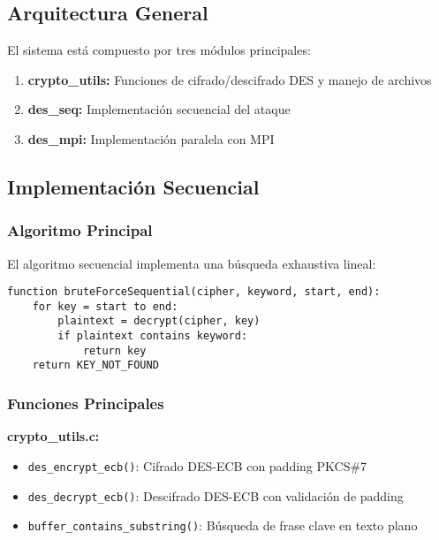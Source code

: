 \documentclass[12pt,letterpaper]{article}
\begin{document}
\subsection{Arquitectura General}

El sistema está compuesto por tres módulos principales:

\begin{enumerate}
    \item \textbf{crypto\_utils:} Funciones de cifrado/descifrado DES y manejo de archivos
    \item \textbf{des\_seq:} Implementación secuencial del ataque
    \item \textbf{des\_mpi:} Implementación paralela con MPI
\end{enumerate}

\subsection{Implementación Secuencial}

\subsubsection{Algoritmo Principal}

El algoritmo secuencial implementa una búsqueda exhaustiva lineal:

\begin{lstlisting}[caption=Pseudocódigo del algoritmo secuencial, label=lst:seq-algo]
function bruteForceSequential(cipher, keyword, start, end):
    for key = start to end:
        plaintext = decrypt(cipher, key)
        if plaintext contains keyword:
            return key
    return KEY_NOT_FOUND
\end{lstlisting}

\subsubsection{Funciones Principales}

\textbf{crypto\_utils.c:}
\begin{itemize}
    \item \texttt{des\_encrypt\_ecb()}: Cifrado DES-ECB con padding PKCS\#7
    \item \texttt{des\_decrypt\_ecb()}: Descifrado DES-ECB con validación de padding
    \item \texttt{buffer\_contains\_substring()}: Búsqueda de frase clave en texto plano
\end{itemize}
\end{document}
